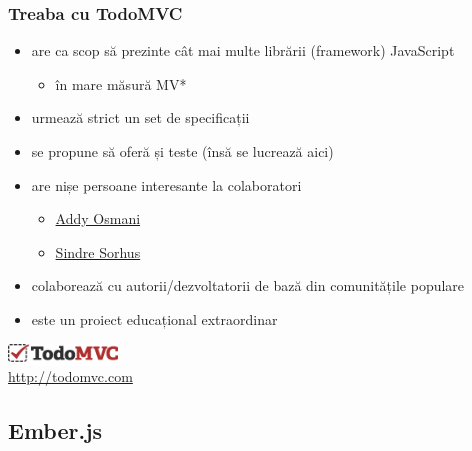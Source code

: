 \documentclass[compress]{beamer}
\begin{document}
\begin{frame}

\frametitle{Treaba cu TodoMVC}

\begin{itemize}[<+->]
  \item are ca scop să prezinte cât mai multe librării (framework) JavaScript
    \begin{itemize}[<+->]
      \item în mare măsură MV*
    \end{itemize}
  \item urmează strict un set de specificații
  \item se propune să oferă și teste (însă se lucrează aici)
  \item are nișe persoane interesante la colaboratori
    \begin{itemize}[<+->]
      \item \href{https://twitter.com/addyosmani}{Addy Osmani}
      \item \href{https://twitter.com/sindresorhus}{Sindre Sorhus}
    \end{itemize}
  \item colaborează cu autorii/dezvoltatorii de bază din comunitățile populare
  \item este un proiect educațional extraordinar
\end{itemize}

\begin{flushright}
  \colorbox{white}{\includegraphics[height=0.5cm]{todomvc.png}}
  \\
  \tiny \url{http://todomvc.com}
\end{flushright}

\end{frame}

\subsection{Ember.js}
\end{document}
